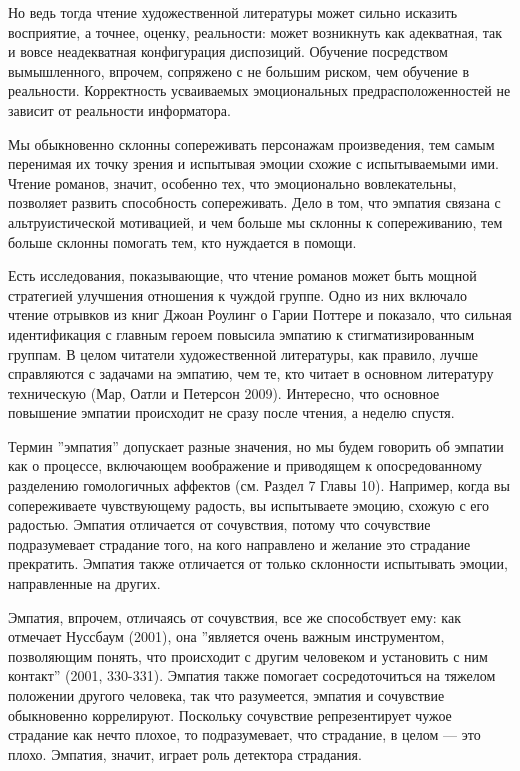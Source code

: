\documentclass[11pt]{book}
\begin{document}
Но ведь тогда чтение художественной литературы может сильно исказить восприятие, а точнее, оценку, реальности: может возникнуть как адекватная, так и вовсе неадекватная конфигурация диспозиций. Обучение посредством вымышленного, впрочем, сопряжено с не большим риском, чем обучение в реальности. Корректность усваиваемых эмоциональных предрасположенностей не зависит от реальности информатора.

Мы обыкновенно склонны сопереживать персонажам произведения, тем самым перенимая их точку зрения и испытывая эмоции схожие с испытываемыми ими. Чтение романов, значит, особенно тех, что эмоционально вовлекательны, позволяет развить способность сопереживать. Дело в том, что эмпатия связана с альтруистической мотивацией, и чем больше мы склонны к сопереживанию, тем больше склонны помогать тем, кто нуждается в помощи.

Есть исследования, показывающие, что чтение романов может быть мощной стратегией улучшения отношения к чуждой группе. Одно из них включало чтение отрывков из книг Джоан Роулинг о Гарии Поттере и показало, что сильная идентификация с главным героем повысила эмпатию к стигматизированным группам. В целом читатели художественной литературы, как правило, лучше справляются с задачами на эмпатию, чем те, кто читает в основном литературу техническую (Мар, Оатли и Петерсон 2009). Интересно, что основное повышение эмпатии происходит не сразу после чтения, а неделю спустя.

Термин ''эмпатия'' допускает разные значения, но мы будем говорить об эмпатии как о процессе, включающем воображение и приводящем к опосредованному разделению гомологичных аффектов (см. Раздел 7 Главы 10). Например, когда вы сопереживаете чувствующему радость, вы испытываете эмоцию, схожую с его радостью. Эмпатия отличается от сочувствия, потому что сочувствие подразумевает страдание того, на кого направлено и желание это страдание прекратить. Эмпатия также отличается от только склонности испытывать эмоции, направленные на других.

Эмпатия, впрочем, отличаясь от сочувствия, все же способствует ему: как отмечает Нуссбаум (2001), она ''является очень важным инструментом, позволяющим понять, что происходит с другим человеком и установить с ним контакт'' (2001, 330-331). Эмпатия также помогает сосредоточиться на тяжелом положении другого человека, так что разумеется, эмпатия и сочувствие обыкновенно коррелируют. Поскольку сочувствие репрезентирует чужое страдание как нечто плохое, то подразумевает, что страдание, в целом --- это плохо. Эмпатия, значит, играет роль детектора страдания.
\end{document}
